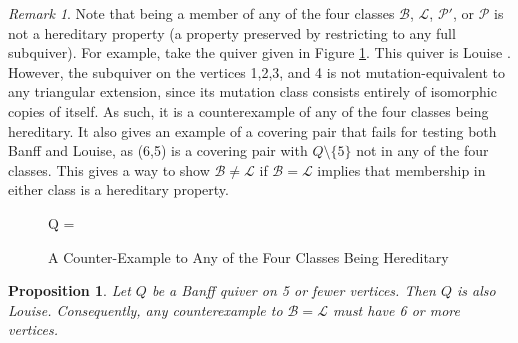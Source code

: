 \documentclass[10pt]{amsart}
\newtheorem{prop}[thm]{Proposition}
\theoremstyle{definition}
\theoremstyle{remark}
\newtheorem{rema}[thm]{Remark}
\newcommand{\BB}{\mathcal{B}}
\newcommand{\PP}{\mathcal{P}}
\newcommand{\LL}{\mathcal{L}}
\begin{document}
\begin{rema}
Note that being a member of any of the four classes $\BB$, $\LL$, $\PP'$, or $\PP$ is not a hereditary property (a property preserved by restricting to any full subquiver).
For example, take the quiver given in Figure \ref{fig-counter-example}.
This quiver is Louise \cite[Remark 11.15]{MR2995670}.
However, the subquiver on the vertices 1,2,3, and 4 is not mutation-equivalent to any triangular extension, since its mutation class consists entirely of isomorphic copies of itself.
As such, it is a counterexample of any of the four classes being hereditary.  
It also gives an example of a covering pair that fails for testing both Banff and Louise, as (6,5) is a covering pair with $Q \setminus \{5\}$ not in any of the four classes.
This gives a way to show $\BB \neq \LL$ if $\BB = \LL$ implies that membership in either class is a hereditary property.

\begin{figure}[ht]
    \centering
    Q =
    \caption{A Counter-Example to Any of the Four Classes Being Hereditary}
    \label{fig-counter-example}
\end{figure}
\end{rema}

\begin{prop}\label{prop-size-counterexample}
Let $Q$ be a Banff quiver on 5 or fewer vertices.
Then $Q$ is also Louise.
Consequently, any counterexample to $\BB = \LL$ must have 6 or more vertices.
\end{prop}
\end{document}
